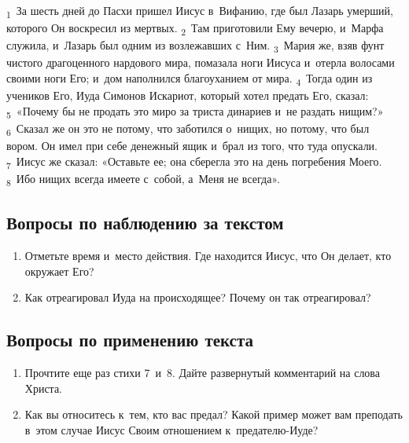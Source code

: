 \documentclass[a4paper,12pt]{article}
\begin{document}
\textsubscript{1}~За шесть дней до Пасхи пришел Иисус в~Вифанию, где был Лазарь умерший, которого Он воскресил из мертвых. \textsubscript{2}~Там приготовили Ему вечерю, и~Марфа служила, и~Лазарь был одним из возлежавших с~Ним. \textsubscript{3}~Мария же, взяв фунт чистого драгоценного нардового мира, помазала ноги Иисуса и~отерла волосами своими ноги Его; и~дом наполнился благоуханием от мира. \textsubscript{4}~Тогда один из учеников Его, Иуда Симонов Искариот, который хотел предать Его, сказал: \textsubscript{5}~«Почему бы не продать это миро за триста динариев и~не раздать нищим?» \textsubscript{6}~Сказал же он это не потому, что заботился о~нищих, но потому, что был вором. Он имел при себе денежный ящик и~брал из того, что туда опускали. \textsubscript{7}~Иисус же сказал: «Оставьте ее; она сберегла это на день погребения Моего. \textsubscript{8}~Ибо нищих всегда имеете с~собой, а~Меня не всегда».

\subsection*{Вопросы по наблюдению за текстом}
\begin{enumerate}
    \item Отметьте время и~место действия. Где находится Иисус, что Он делает, кто окружает Его? 
    
    \myline
    
    \myline
    \item Как отреагировал Иуда на происходящее? Почему он так отреагировал? 
    
    \myline
    
    \myline
\end{enumerate}

\subsection*{Вопросы по применению текста} 
\begin{enumerate}
    \item Прочтите еще раз стихи 7~и~8. Дайте развернутый комментарий на слова Христа. 
    
    \myline
    
    \myline
    \item Как вы относитесь к~тем, кто вас предал? Какой пример может вам преподать в~этом случае Иисус Своим отношением к~предателю-Иуде? 
    
    \myline
    
    \myline
\end{enumerate}
\end{document}
